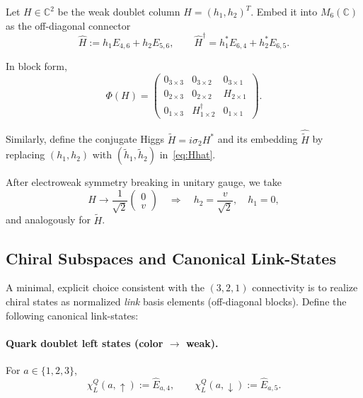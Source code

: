 Let $H \in \mathbb{C}^2$ be the weak doublet column $H = (h_1, h_2)^T$.
Embed it into $M_6(\mathbb{C})$ as the off-diagonal connector
\begin{equation}
\widehat{H} := h_1 E_{4,6} + h_2 E_{5,6},
\qquad
\widehat{H}^\dagger = h_1^* E_{6,4} + h_2^* E_{6,5}.
\label{eq:Hhat}
\end{equation}

In block form,
\begin{equation}
\Phi(H) = \begin{pmatrix}
0_{3\times 3} & 0_{3\times 2} & 0_{3\times 1} \\
0_{2\times 3} & 0_{2\times 2} & H_{2\times 1} \\
0_{1\times 3} & H^\dagger_{1\times 2} & 0_{1\times 1}
\end{pmatrix}.
\end{equation}

Similarly, define the conjugate Higgs $\widetilde{H} = i\sigma_2 H^*$ and its embedding 
$\widehat{\widetilde{H}}$ by replacing $(h_1, h_2)$ with $(\tilde{h}_1, \tilde{h}_2)$ 
in~\eqref{eq:Hhat}.

After electroweak symmetry breaking in unitary gauge, we take
\begin{equation}
H \to \frac{1}{\sqrt{2}} \begin{pmatrix} 0 \\ v \end{pmatrix}
\quad \Rightarrow \quad
h_2 = \frac{v}{\sqrt{2}}, \quad h_1 = 0,
\label{eq:EWSB}
\end{equation}
and analogously for $\widetilde{H}$.

\subsection{Chiral Subspaces and Canonical Link-States}

A minimal, explicit choice consistent with the $(3,2,1)$ connectivity is to realize chiral states 
as normalized \emph{link} basis elements (off-diagonal blocks). Define the following canonical 
link-states:

\paragraph{Quark doublet left states (color $\to$ weak).}
For $a \in \{1,2,3\}$,
\begin{equation}
\chi^{Q}_{L}(a,\uparrow) := \widehat{E}_{a,4}, \qquad
\chi^{Q}_{L}(a,\downarrow) := \widehat{E}_{a,5}.
\end{equation}

